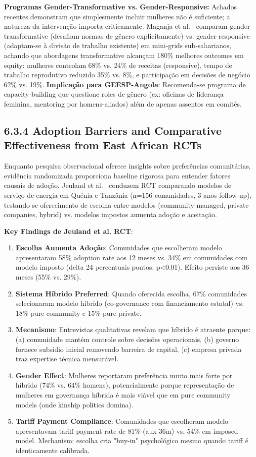 \documentclass[12pt, a4paper]{article}
\begin{document}
\textbf{Programas Gender-Transformative vs. Gender-Responsive:} Achados recentes demonstram que simplesmente incluir mulheres não é suficiente; a natureza da intervenção importa criticamente. Maganja et al.~\citep{Maganja2024} comparam gender-transformative (desafiam normas de gênero explicitamente) vs. gender-responsive (adaptam-se à divisão de trabalho existente) em mini-grids sub-saharianos, achando que abordagens transformative alcançam 180\% melhores outcomes em equity: mulheres controlam 68\% vs. 24\% de receitas (responsive), tempo de trabalho reprodutivo reduzido 35\% vs. 8\%, e participação em decisões de negócio 62\% vs. 19\%. 
\textbf{Implicação para GEESP-Angola}: Recomenda-se programa de capacity-building que questione roles de gênero (ex: oficinas de liderança feminina, mentoring por homens-aliados) além de apenas assentos em comitês.

\subsection*{6.3.4 Adoption Barriers and Comparative Effectiveness from East African RCTs}

Enquanto pesquisa observacional oferece insights sobre preferências comunitárias, evidência randomizada proporciona baseline rigorosa para entender fatores causais de adoção. Jeuland et al.~\citep{Jeuland2023} conduzem RCT comparando modelos de serviço de energia em Quénia e Tanzânia (n=156 comunidades, 3 anos follow-up), testando se oferecimento de escolha entre modelos (community-managed, private companies, hybrid) vs. modelos impostos aumenta adoção e aceitação.

\textbf{Key Findings de Jeuland et al. RCT}:
\begin{enumerate}
\item \textbf{Escolha Aumenta Adoção}: Comunidades que escolheram modelo apresentaram 58\% adoption rate aos 12 meses vs. 34\% em comunidades com modelo imposto (delta 24 percentuais pontos; p<0.01). Efeito persiste aos 36 meses (55\% vs. 29\%).
\item \textbf{Sistema Híbrido Preferred}: Quando oferecida escolha, 67\% comunidades selecionaram modelo híbrido (co-governance com financiamento estatal) vs. 18\% pure community e 15\% pure private.
\item \textbf{Mecanismo}: Entrevistas qualitativas revelam que híbrido é atraente porque: (a) comunidade mantém controle sobre decisões operacionais, (b) governo fornece subsidio inicial removendo barreira de capital, (c) empresa privada traz expertise técnica mensurável.
\item \textbf{Gender Effect}: Mulheres reportaram preferência muito mais forte por híbrido (74\% vs. 64\% homens), potencialmente porque representação de mulheres em governança híbrida é mais viável que em pure community models (onde kinship politics domina).
\item \textbf{Tariff Payment Compliance}: Comunidades que escolheram modelo apresentavam tariff payment rate de 81\% (aux 36m) vs. 54\% em imposed model. Mechanism: escolha cria "buy-in" psychológico mesmo quando tariff é identicamente calibrada.
\end{enumerate}
\end{document}
